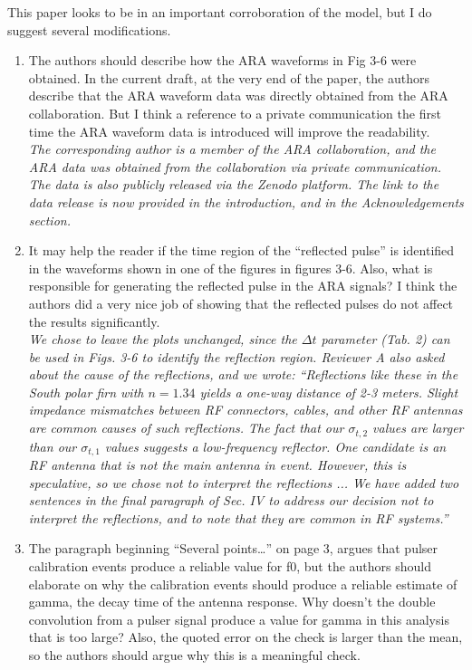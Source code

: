 \documentclass[amsmath,amssymb,aps,prd,10pt,twocolumn,showkeys]{revtex4}
\begin{document}
This paper looks to be in an important corroboration of the model, but I do suggest several modifications.

\begin{enumerate}

\item The authors should describe how the ARA waveforms in Fig 3-6 were obtained.  In the current draft, at the very end of the paper, the authors describe that the ARA waveform data was directly obtained from the ARA collaboration.  But I think a reference to a private communication the first time the ARA waveform data is introduced will improve the readability. \\

\textit{The corresponding author is a member of the ARA collaboration, and the ARA data was obtained from the collaboration via private communication.  The data is also publicly released via the Zenodo platform.  The link to the data release is now provided in the introduction, and in the Acknowledgements section.}

\item It may help the reader if the time region of the  ``reflected pulse'' is identified in the waveforms shown in one of the figures in figures 3-6. Also, what is responsible for generating the reflected pulse in the ARA signals? I think the authors did a very nice job of showing that the reflected pulses do not affect the results significantly.\\

\textit{We chose to leave the plots unchanged, since the $\Delta t$ parameter (Tab. 2) can be used in Figs. 3-6 to identify the reflection region. Reviewer A also asked about the cause of the reflections, and we wrote:  ``Reflections like these in the South polar firn with $n=1.34$ yields a one-way distance of 2-3 meters.  Slight impedance mismatches between RF connectors, cables, and other RF antennas are common causes of such reflections.  The fact that our $\sigma_{t,2}$ values are larger than our $\sigma_{t,1}$ values suggests a low-frequency reflector.  One candidate is an RF antenna that is not the main antenna in event.  However, this is speculative, so we chose not to interpret the reflections ... We have added two sentences in the final paragraph of Sec. IV to address our decision not to interpret the reflections, and to note that they are common in RF systems.''}

\item The paragraph beginning “Several points…” on page 3, argues that pulser calibration events produce a reliable value for f0, but the authors should elaborate on why the calibration events should produce a reliable estimate of gamma, the decay time of the antenna response.  Why doesn’t the double convolution from a pulser signal produce a value for gamma in this analysis that is too large?  Also, the quoted error on the check is larger than the mean, so the authors should argue why this is a meaningful check. \\


\end{enumerate}
\end{document}
